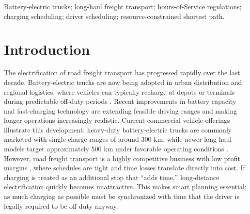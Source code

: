 \documentclass[3p,11pt,authoryear]{elsarticle}  %
\begin{document}
\begin{frontmatter}


\begin{keyword}
Battery-electric trucks; long-haul freight transport; hours-of-Service regulations; charging scheduling; driver scheduling; resource-constrained shortest path.
\end{keyword}

\end{frontmatter}



\section{Introduction}
\label{sec:Intro}

    The electrification of road freight transport has progressed rapidly over the last decade. Battery-electric trucks are now being adopted in urban distribution and regional logistics, where vehicles can typically recharge at depots or terminals during predictable off-duty periods \cite{shoman2023battery}. Recent improvements in battery capacity and fast-charging technology are extending feasible driving ranges and making longer operations increasingly realistic. Current commercial vehicle offerings illustrate this development: heavy-duty battery-electric trucks are commonly marketed with single-charge ranges of around 300 km, while newer long-haul models target approximately 500 km under favorable operating conditions \citep{volvofhElectric,mercedesEactros600}. However, road freight transport is a highly competitive business with low profit margins \citep{eu2025roadcharges}, where schedules are tight and time losses translate directly into cost. If charging is treated as an additional stop that “adds time,” long-distance electrification quickly becomes unattractive. This makes smart planning essential: as much charging as possible must be synchronized with time that the driver is legally required to be off-duty anyway.
\end{document}
